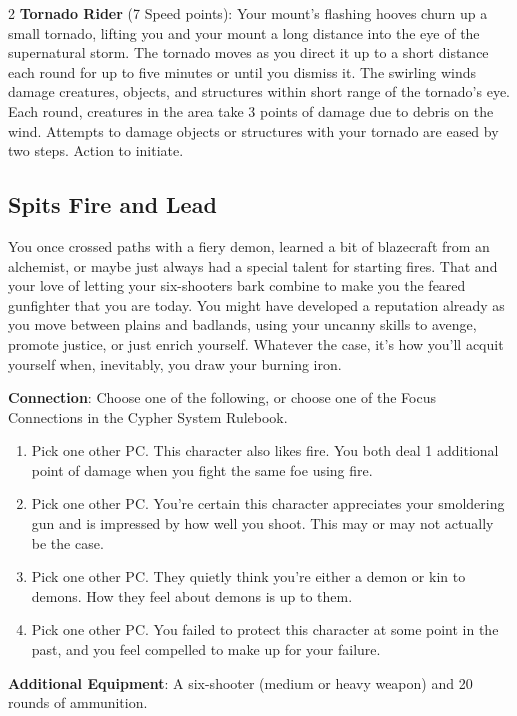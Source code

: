\begin{multicols}{2}
\textbf{Tornado Rider} (7 Speed points): Your mount’s flashing hooves churn up a small tornado, lifting you and your mount a long distance into the eye of the supernatural storm. The tornado moves as you direct it up to a short distance each round for up to five minutes or until you dismiss it. The swirling winds damage creatures, objects, and structures within short range of the tornado’s eye. Each round, creatures in the area take 3 points of damage due to debris on the wind. Attempts to damage objects or structures with your tornado are eased by two steps. Action to initiate. 

\subsection{Spits Fire and Lead}

You once crossed paths with a fiery demon, learned a bit of blazecraft from an alchemist, or maybe just always had a special talent for starting fires. That and your love of letting your six-shooters bark combine to make you the feared gunfighter that you are today. You might have developed a reputation already as you move between plains and badlands, using your uncanny skills to avenge, promote justice, or just enrich yourself. Whatever the case, it’s how you’ll acquit yourself when, inevitably, you draw your burning iron.

\textbf{Connection}: Choose one of the following, or choose one of the Focus Connections in the Cypher System Rulebook. 
\begin{enumerate} 
\item Pick one other PC. This character also likes fire. You both deal 1 additional point of damage when you fight the same foe using fire. 
\item Pick one other PC. You’re certain this character appreciates your smoldering gun and is impressed by how well you shoot. This may or may not actually be the case. 
\item Pick one other PC. They quietly think you’re either a demon or kin to demons. How they feel about demons is up to them. 
\item Pick one other PC. You failed to protect this character at some point in the past, and you feel compelled to make up for your failure. 
\end{enumerate}

\textbf{Additional Equipment}: A six-shooter (medium or heavy weapon) and 20 rounds of ammunition. 


\end{multicols}
